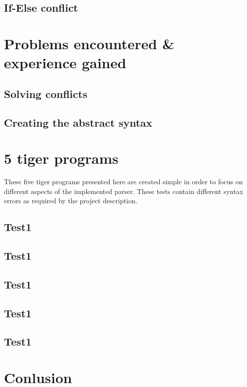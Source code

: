 \documentclass{article}
\begin{document}
\subsection{If-Else conflict}

\section{Problems encountered \& experience gained}
\subsection{Solving conflicts}

\subsection{Creating the abstract syntax}


\section{5 tiger programs}


These five tiger programs presented here are created simple in order to focus on different aspects of the implemented parser. These tests contain different syntax errors as required by the project description. 

\subsection{Test1}

\subsection{Test1}
\subsection{Test1}
\subsection{Test1}
\subsection{Test1}


\section{Conlusion}
\end{document}
